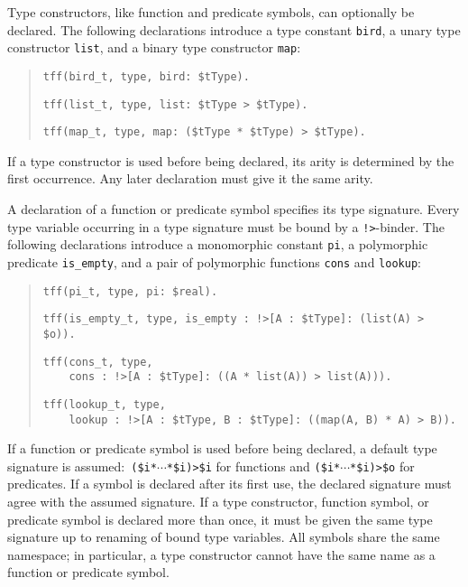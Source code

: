 
 Type constructors,
like function and predicate symbols,
can optionally be declared.
The following declarations introduce a type
constant {\tt bird}, a unary type constructor {\tt list},
and a binary type constructor {\tt map}:
\begin{quote}
\verb+tff(bird_t, type, bird: $tType).+
\par\smallskip
\verb+tff(list_t, type, list: $tType > $tType).+
\par\smallskip
\verb+tff(map_t, type, map: ($tType * $tType) > $tType).+
\end{quote}
If a type constructor is used before being declared, its arity is
determined by the first occurrence. Any later declaration
must give it the same arity.

A declaration of a function or predicate symbol specifies its type signature.
Every type variable occurring in a type signature must be bound by a
{\tt !>}-binder.
The following declarations introduce a monomorphic
constant {\tt pi}, a polymorphic predicate
{\tt is\_empty}, and a pair of polymorphic functions {\tt cons} and {\tt lookup}:
\begin{quote}
\verb+tff(pi_t, type, pi: $real).+
\par\smallskip
\verb+tff(is_empty_t, type, is_empty : !>[A : $tType]: (list(A) > $o)).+\kern-10mm
\par\smallskip
\pagebreak[2] %
\verb+tff(cons_t, type,+\\
\verb+    cons : !>[A : $tType]: ((A * list(A)) > list(A))).+
\par\smallskip
\pagebreak[2] %
\verb+tff(lookup_t, type,+\\
\verb+    lookup : !>[A : $tType, B : $tType]: ((map(A, B) * A) > B)).+\kern-10mm
\end{quote}
If a function or predicate symbol is used before being declared, a
default type signature is assumed:\ {\tt (\$i\;*\;${\cdots}$\;*\;\$i)\;>\;\$i}
for functions and {\tt (\$i\;*\;${\cdots}$\;*\;\$i)\;>\;\$o} for predicates.
If a symbol is declared after its first use, the declared signature
must agree with the assumed signature.
%
If a type constructor, function symbol, or predicate symbol is declared more
than once, it must be given the same type signature up to renaming of bound
type variables.
All symbols share the same namespace; in particular, a type constructor
cannot have the same name as a function or predicate symbol.

